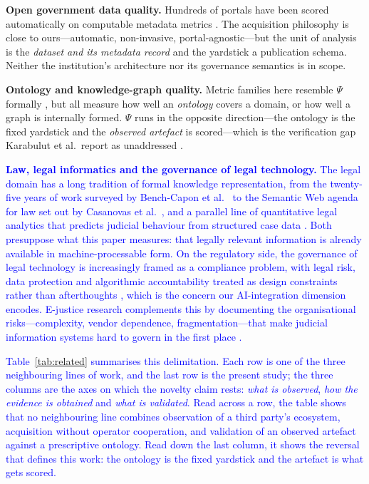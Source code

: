 \documentclass[engproc,proceedingpaper,submit,moreauthors]{Definitions/mdpi}
\newcounter{algo}
\begin{document}
    \textbf{Open government data quality.} Hundreds of portals have been scored automatically on computable metadata metrics \cite{Neumaier2016,Kubler2018,Vetro2016}. The acquisition philosophy is close to ours---automatic, non-invasive, portal-agnostic---but the unit of analysis is the \emph{dataset and its metadata record} and the yardstick a publication schema. Neither the institution's architecture nor its governance semantics is in scope.

    \textbf{Ontology and knowledge-graph quality.} Metric families here resemble $\Psi$ formally \cite{Zaitoun2023,AbadNavarro2025,Seo2022}, but all measure how well an \emph{ontology} covers a domain, or how well a graph is internally formed. $\Psi$ runs in the opposite direction---the ontology is the fixed yardstick and the \emph{observed artefact} is scored---which is the verification gap Karabulut et al.\ report as unaddressed \cite{Karabulut2024}. %

    \textcolor{blue}{\textbf{Law, legal informatics and the governance of legal technology.} The legal domain has a long tradition of formal knowledge representation, from the twenty-five years of work surveyed by Bench-Capon et al.\ \cite{BenchCapon2012} to the Semantic Web agenda for law set out by Casanovas et al.\ \cite{Casanovas2016}, and a parallel line of quantitative legal analytics that predicts judicial behaviour from structured case data \cite{Katz2017,Medvedeva2020}. Both presuppose what this paper measures: that legally relevant information is already available in machine-processable form. On the regulatory side, the governance of legal technology is increasingly framed as a compliance problem, with legal risk, data protection and algorithmic accountability treated as design constraints rather than afterthoughts \cite{Li2024HFTP}, which is the concern our AI-integration dimension encodes. E-justice research complements this by documenting the organisational risks---complexity, vendor dependence, fragmentation---that make judicial information systems hard to govern in the first place \cite{Rosa2013}.}

    \textcolor{blue}{Table~\ref{tab:related} summarises this delimitation. Each row is one of the three neighbouring lines of work, and the last row is the present study; the three columns are the axes on which the novelty claim rests: \emph{what is observed}, \emph{how the evidence is obtained} and \emph{what is validated}. Read across a row, the table shows that no neighbouring line combines observation of a third party's ecosystem, acquisition without operator cooperation, and validation of an observed artefact against a prescriptive ontology. Read down the last column, it shows the reversal that defines this work: the ontology is the fixed yardstick and the artefact is what gets scored.}
\end{document}
